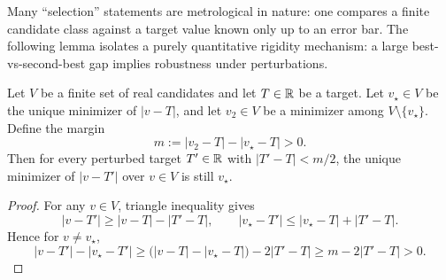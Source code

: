 Many ``selection'' statements are metrological in nature: one compares a finite candidate class against a target value known only up to an error bar. The following lemma isolates a purely quantitative rigidity mechanism: a large best-vs-second-best gap implies robustness under perturbations.

\begin{lemma}
\label{lem:gap_stability}
Let $V$ be a finite set of real candidates and let $T\in\mathbb{R}$ be a target. Let $v_\star\in V$ be the unique minimizer of $|v-T|$, and let $v_2\in V$ be a minimizer among $V\setminus\{v_\star\}$. Define the margin
\begin{equation}
\label{eq:margin_def}
m:=|v_2-T|-|v_\star-T|>0.
\end{equation}
Then for every perturbed target $T'\in\mathbb{R}$ with $|T'-T|<m/2$, the unique minimizer of $|v-T'|$ over $v\in V$ is still $v_\star$.
\end{lemma}

\begin{proof}
For any $v\in V$, triangle inequality gives
\[
|v-T'|\ge |v-T|-|T'-T|,
\qquad
|v_\star-T'|\le |v_\star-T|+|T'-T|.
\]
Hence for $v\neq v_\star$,
\[
|v-T'|-|v_\star-T'|
\ge
\big(|v-T|-|v_\star-T|\big)-2|T'-T|
\ge m-2|T'-T|>0.
\]
\end{proof}



